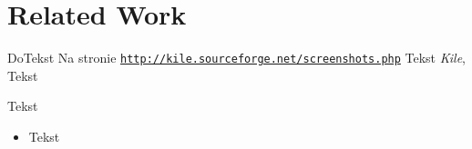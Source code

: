 
\section{Related Work}
\label{sec:realted_work}


DoTekst
Na stronie \underline{\texttt{http://kile.sourceforge.net/screenshots.php}} Tekst {\em Kile}, Tekst

Tekst

\begin{itemize}
\item Tekst
\end{itemize}
